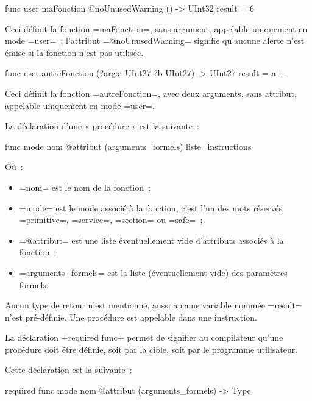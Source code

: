 \begin{PLM}
func user maFonction @noUnusedWarning () -> UInt32 {
  result = 6
}
\end{PLM}

Ceci définit la fonction \plm=maFonction=, sans argument, appelable uniquement en mode \plm=user=~; l'attribut \plm=@noUnusedWarning= signifie qu'aucune alerte n'est émise si la fonction n'est pas utilisée.

\begin{PLM}
func user autreFonction (?arg:a UInt27 ?b UInt27) -> UInt27 {
  result = a +%
}
\end{PLM}

Ceci définit la fonction \plm=autreFonction=, avec deux arguments, sans attribut, appelable uniquement en mode \plm=user=.





La déclaration d'une « procédure » est la suivante~:
\begin{PLM}
func mode nom @attribut (arguments_formels) {
  liste_instructions
}
\end{PLM}
Où~:
\begin{itemize}
  \item \plm=nom= est le nom de la fonction~;
  \item \plm=mode= est le mode associé à la fonction, c'est l'un des mots réservés \plm=primitive=, \plm=service=, \plm=section= ou \plm=safe=~;
  \item \plm=@attribut= est une liste éventuellement vide d'attributs associés à la fonction~;
  \item \plm=arguments_formels= est la liste (éventuellement vide) des paramètres formels.
\end{itemize}

Aucun type de retour n'est mentionné, aussi aucune variable nommée \plm=result= n'est pré-définie. Une procédure est appelable dans une instruction.











La déclaration \plm+required func+ permet de signifier au compilateur qu'une procédure doit être définie, soit par la cible, soit par le programme utilisateur.

Cette déclaration est la suivante~:
\begin{PLM}
required func mode nom @attribut (arguments_formels) -> Type
\end{PLM}

